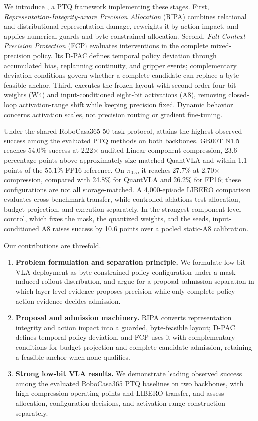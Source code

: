 We introduce \method, a PTQ framework implementing these stages. First, \emph{Representation-Integrity-aware Precision Allocation} (RIPA) combines relational and distributional representation damage, reweights it by action impact, and applies numerical guards and byte-constrained allocation. Second, \emph{Full-Context Precision Protection} (FCP) evaluates interventions in the complete mixed-precision policy. Its D-PAC defines temporal policy deviation through accumulated bias, replanning continuity, and gripper events; complementary deviation conditions govern whether a complete candidate can replace a byte-feasible anchor. Third, \dyrange executes the frozen layout with second-order four-bit weights (W4) and input-conditioned eight-bit activations (A8), removing closed-loop activation-range shift while keeping precision fixed. Dynamic behavior concerns activation scales, not precision routing or gradient fine-tuning.



Under the shared RoboCasa365 50-task protocol, \method attains the highest observed success among the evaluated PTQ methods on both backbones. GR00T N1.5 reaches 54.0\% success at 2.22$\times$ audited Linear-component compression, 23.6 percentage points above approximately size-matched QuantVLA and within 1.1 points of the 55.1\% FP16 reference. On $\pi_{0.5}$, it reaches 27.7\% at 2.70$\times$ compression, compared with 24.8\% for QuantVLA and 26.2\% for FP16; these configurations are not all storage-matched. A 4,000-episode LIBERO comparison evaluates cross-benchmark transfer, while controlled ablations test allocation, budget projection, and execution separately. In the strongest component-level control, which fixes the mask, the quantized weights, and the seeds, input-conditioned A8 raises success by 10.6 points over a pooled static-A8 calibration.

Our contributions are threefold.
\begin{enumerate}[label=(\arabic*)]
    \item \textbf{Problem formulation and separation principle.} We formulate low-bit VLA deployment as byte-constrained policy configuration under a mask-induced rollout distribution, and argue for a proposal--admission separation in which layer-level evidence proposes precision while only complete-policy action evidence decides admission.
    \item \textbf{Proposal and admission machinery.} RIPA converts representation integrity and action impact into a guarded, byte-feasible layout; D-PAC defines temporal policy deviation, and FCP uses it with complementary conditions for budget projection and complete-candidate admission, retaining a feasible anchor when none qualifies.
    \item \textbf{Strong low-bit VLA results.} We demonstrate leading observed success among the evaluated RoboCasa365 PTQ baselines on two backbones, with high-compression operating points and LIBERO transfer, and assess allocation, configuration decisions, and activation-range construction separately.
\end{enumerate}
